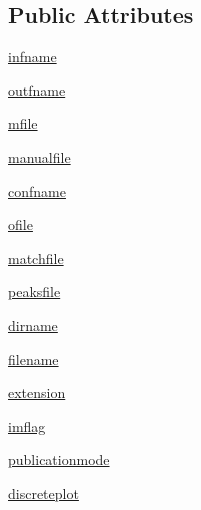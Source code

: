 \subsection*{Public Attributes}
\begin{DoxyCompactItemize}
\item 
\hyperlink{class_uni_dec_1_1unidec__modules_1_1unidecstructure_1_1_uni_dec_config_a025a9fa3c588b52b567d198c0c85e132}{infname}
\item 
\hyperlink{class_uni_dec_1_1unidec__modules_1_1unidecstructure_1_1_uni_dec_config_a4b973eda18a32012f4210957b19c9fc3}{outfname}
\item 
\hyperlink{class_uni_dec_1_1unidec__modules_1_1unidecstructure_1_1_uni_dec_config_a3974a902330b5e1b32933f9db38b5736}{mfile}
\item 
\hyperlink{class_uni_dec_1_1unidec__modules_1_1unidecstructure_1_1_uni_dec_config_aab3e423261e5d554f22d552754692d6d}{manualfile}
\item 
\hyperlink{class_uni_dec_1_1unidec__modules_1_1unidecstructure_1_1_uni_dec_config_a8ec31b0e9ffd71a63645321590c1824a}{confname}
\item 
\hyperlink{class_uni_dec_1_1unidec__modules_1_1unidecstructure_1_1_uni_dec_config_aa2a5eab8be32aa07275371da00b7991d}{ofile}
\item 
\hyperlink{class_uni_dec_1_1unidec__modules_1_1unidecstructure_1_1_uni_dec_config_af17513a4bc6d6a101683431f34410fb8}{matchfile}
\item 
\hyperlink{class_uni_dec_1_1unidec__modules_1_1unidecstructure_1_1_uni_dec_config_a2ecb4aacfe5857d8065dacfb30f71b19}{peaksfile}
\item 
\hyperlink{class_uni_dec_1_1unidec__modules_1_1unidecstructure_1_1_uni_dec_config_a9b7e155194d286fa2ed4fc5a72979870}{dirname}
\item 
\hyperlink{class_uni_dec_1_1unidec__modules_1_1unidecstructure_1_1_uni_dec_config_a91ce748b0120c321965e7d9ddbb490bf}{filename}
\item 
\hyperlink{class_uni_dec_1_1unidec__modules_1_1unidecstructure_1_1_uni_dec_config_a02596fc193e552b6f6a69158a4c519e8}{extension}
\item 
\hyperlink{class_uni_dec_1_1unidec__modules_1_1unidecstructure_1_1_uni_dec_config_a56a980fb224d7f8175573f7062a29c97}{imflag}
\item 
\hyperlink{class_uni_dec_1_1unidec__modules_1_1unidecstructure_1_1_uni_dec_config_a6d90b49a472bbbe9cee8100cd2dc7acb}{publicationmode}
\item 
\hyperlink{class_uni_dec_1_1unidec__modules_1_1unidecstructure_1_1_uni_dec_config_adf1acc682903c14bee570831f85a0cbf}{discreteplot}

\end{DoxyCompactItemize}
